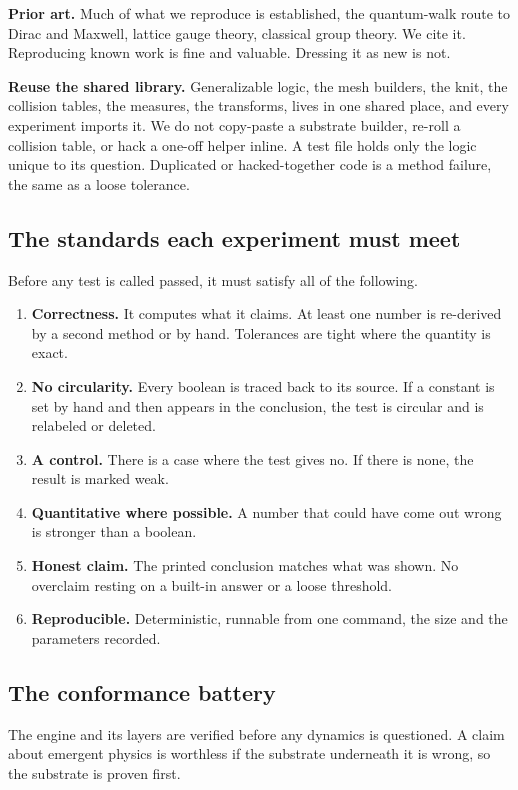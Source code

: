\textbf{Prior art.} Much of what we reproduce is established, the quantum-walk route to Dirac and Maxwell, lattice gauge theory, classical group theory. We cite it. Reproducing known work is fine and valuable. Dressing it as new is not.

\textbf{Reuse the shared library.} Generalizable logic, the mesh builders, the knit, the collision tables, the measures, the transforms, lives in one shared place, and every experiment imports it. We do not copy-paste a substrate builder, re-roll a collision table, or hack a one-off helper inline. A test file holds only the logic unique to its question. Duplicated or hacked-together code is a method failure, the same as a loose tolerance.

\subsection{The standards each experiment must meet}

Before any test is called passed, it must satisfy all of the following.

\begin{enumerate}
\item \textbf{Correctness.} It computes what it claims. At least one number is re-derived by a second method or by hand. Tolerances are tight where the quantity is exact.
\item \textbf{No circularity.} Every boolean is traced back to its source. If a constant is set by hand and then appears in the conclusion, the test is circular and is relabeled or deleted.
\item \textbf{A control.} There is a case where the test gives no. If there is none, the result is marked weak.
\item \textbf{Quantitative where possible.} A number that could have come out wrong is stronger than a boolean.
\item \textbf{Honest claim.} The printed conclusion matches what was shown. No overclaim resting on a built-in answer or a loose threshold.
\item \textbf{Reproducible.} Deterministic, runnable from one command, the size and the parameters recorded.
\end{enumerate}

\subsection{The conformance battery}

The engine and its layers are verified before any dynamics is questioned. A claim about emergent physics is worthless if the substrate underneath it is wrong, so the substrate is proven first.

